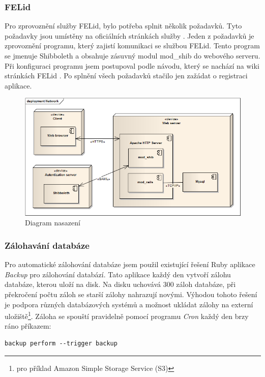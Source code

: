 \subsubsection{FELid}
Pro zprovoznění služby FELid, bylo potřeba splnit několik požadavků. Tyto požadavky jsou umístěny na oficiálních stránkách služby \cite{felid_pozadavky}. Jeden z požadavků je zprovoznění programu, který zajistí komunikaci se službou FELid. Tento program se jmenuje Shibboleth a obsahuje zásuvný modul mod\_shib do webového serveru. Při konfiguraci programu jsem postupoval podle návodu, který se nachází na wiki stránkách FELid \citep{felid}. Po splnění všech požadavků stačilo jen zažádat o registraci aplikace.

\begin{figure}[h]
\begin{center}
\includegraphics[width=12cm]{figures/deployment}
\caption{Diagram nasazení}
\label{fig:deployment}
\end{center}
\end{figure}

\subsubsection{Zálohavání databáze}
Pro automatické zálohování databáze jsem použil existující řešení  Ruby aplikace \textit{Backup} pro zálohování databází. Tato aplikace každý den vytvoří zálohu databáze, kterou uloží na disk. Na disku uchovává 300 záloh databáze, při překročení počtu záloh se starší zálohy nahrazují novými. Výhodou tohoto řešení je podpora různých databázových systémů a možnost ukládat zálohy na externí uložiště\footnote{pro příklad Amazon Simple Storage Service (S3)}. Záloha se spouští pravidelně pomocí programu \textit{Cron} každý den brzy ráno příkazem:
\begin{verbatim}
backup perform --trigger backup
\end{verbatim} 

